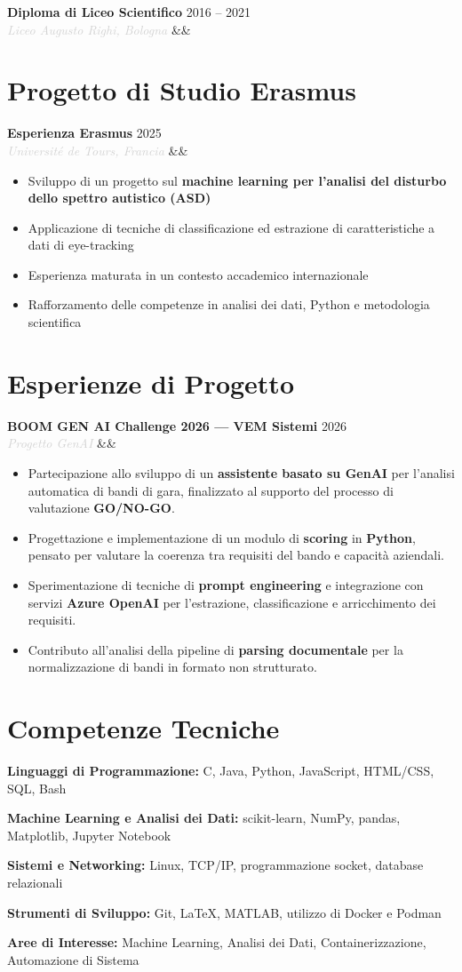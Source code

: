 \documentclass[a4paper,10pt]{article}
\newcommand{\entry}[4]{%
  \noindent\textbf{#1} \hfill \textcolor{accent}{#2}\\
  \textit{\textcolor{lightgray}{#3}}%
  \ifx&#4&\else\\\vspace{0.2em}#4\fi
  \vspace{0.5em}
}
\newcommand{\entrylist}[5]{%
  \noindent\textbf{#1} \hfill \textcolor{accent}{#2}\\
  \textit{\textcolor{lightgray}{#3}}%
  \ifx&#4&\else\\\vspace{0.2em}#4\fi
  \vspace{0.3em}
  \begin{itemize}#5\end{itemize}
  \vspace{0.3em}
}
\newcommand{\skillgroup}[2]{%
  \noindent\textbf{#1:} #2\par\vspace{0.35em}
}
\begin{document}
\entry{Diploma di Liceo Scientifico}{2016 -- 2021}{Liceo Augusto Righi, Bologna}{}

\section{Progetto di Studio Erasmus}

\entrylist{Esperienza Erasmus}{2025}{Université de Tours, Francia}{}{
  \item Sviluppo di un progetto sul \textbf{machine learning per l’analisi del disturbo dello spettro autistico (ASD)}
  \item Applicazione di tecniche di classificazione ed estrazione di caratteristiche a dati di eye-tracking
  \item Esperienza maturata in un contesto accademico internazionale
  \item Rafforzamento delle competenze in analisi dei dati, Python e metodologia scientifica
}

\section{Esperienze di Progetto}

\entrylist{BOOM GEN AI Challenge 2026 — VEM Sistemi}{2026}{Progetto GenAI}{}{
  \item Partecipazione allo sviluppo di un \textbf{assistente basato su GenAI} per l'analisi automatica di bandi di gara, finalizzato al supporto del processo di valutazione \textbf{GO/NO-GO}.
  \item Progettazione e implementazione di un modulo di \textbf{scoring} in \textbf{Python}, pensato per valutare la coerenza tra requisiti del bando e capacità aziendali.
  \item Sperimentazione di tecniche di \textbf{prompt engineering} e integrazione con servizi \textbf{Azure OpenAI} per l'estrazione, classificazione e arricchimento dei requisiti.
  \item Contributo all'analisi della pipeline di \textbf{parsing documentale} per la normalizzazione di bandi in formato non strutturato.
}

\section{Competenze Tecniche}

\skillgroup{Linguaggi di Programmazione}{C, Java, Python, JavaScript, HTML/CSS, SQL, Bash}
\skillgroup{Machine Learning e Analisi dei Dati}{scikit-learn, NumPy, pandas, Matplotlib, Jupyter Notebook}
\skillgroup{Sistemi e Networking}{Linux, TCP/IP, programmazione socket, database relazionali}
\skillgroup{Strumenti di Sviluppo}{Git, \LaTeX, MATLAB, utilizzo di Docker e Podman}
\skillgroup{Aree di Interesse}{Machine Learning,
                               Analisi dei Dati,
                               Containerizzazione, Automazione di Sistema}
\end{document}
